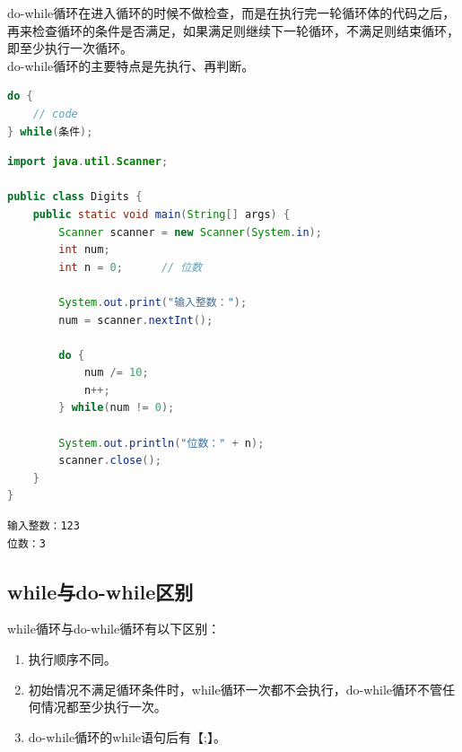 do-while循环在进入循环的时候不做检查，而是在执行完一轮循环体的代码之后，再来检查循环的条件是否满足，如果满足则继续下一轮循环，不满足则结束循环，即至少执行一次循环。\\

do-while循环的主要特点是先执行、再判断。

\vspace{-0.5cm}

\begin{lstlisting}[language=Java]
do {
    // code
} while(条件);
\end{lstlisting}

\vspace{0.5cm}


\begin{lstlisting}[language=Java]
import java.util.Scanner;

public class Digits {
    public static void main(String[] args) {
        Scanner scanner = new Scanner(System.in);
        int num;
        int n = 0;      // 位数
        
        System.out.print("输入整数：");
        num = scanner.nextInt();
        
        do {
            num /= 10;
            n++;
        } while(num != 0);
        
        System.out.println("位数：" + n);
        scanner.close();
    }
}
\end{lstlisting}

\begin{tcolorbox}
    \begin{verbatim}
输入整数：123
位数：3
\end{verbatim}
\end{tcolorbox}

\vspace{0.5cm}

\subsection{while与do-while区别}

while循环与do-while循环有以下区别：

\begin{enumerate}
    \item 执行顺序不同。

    \item 初始情况不满足循环条件时，while循环一次都不会执行，do-while循环不管任何情况都至少执行一次。

    \item do-while循环的while语句后有【;】。
\end{enumerate}

